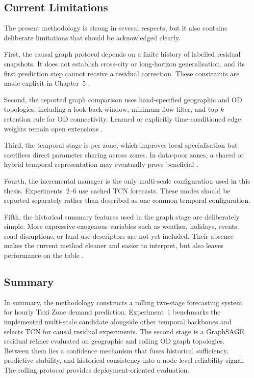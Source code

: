 \documentclass[12pt,a4paper]{report}
\begin{document}
\subsection{Current Limitations}

The present methodology is strong in several respects, but it also contains deliberate limitations that should be acknowledged clearly.

First, the causal graph protocol depends on a finite history of labelled residual snapshots. It does not establish cross-city or long-horizon generalisation, and its first prediction step cannot receive a residual correction. These constraints are made explicit in Chapter~5 \cite{hewamalage2022pitfalls,cerqueira2020evaluating}.

Second, the reported graph comparison uses hand-specified geographic and OD topologies, including a look-back window, minimum-flow filter, and top-\(k\) retention rule for OD connectivity. Learned or explicitly time-conditioned edge weights remain open extensions \cite{west2025weighted,jiang2022survey}.

Third, the temporal stage is per zone, which improves local specialisation but sacrifices direct parameter sharing across zones. In data-poor zones, a shared or hybrid temporal representation may eventually prove beneficial \cite{lim2021survey,zhuang2022sparse}.

Fourth, the incremental manager is the only multi-scale configuration used in this thesis. Experiments~2--6 use cached TCN forecasts. These modes should be reported separately rather than described as one common temporal configuration.

Fifth, the historical summary features used in the graph stage are deliberately simple. More expressive exogenous variables such as weather, holidays, events, road disruptions, or land-use descriptors are not yet included. Their absence makes the current method cleaner and easier to interpret, but also leaves performance on the table \cite{lyu2021bigdata,demandfeatures2023}.

\subsection{Summary}

In summary, the methodology constructs a rolling two-stage forecasting system for hourly Taxi Zone demand prediction. Experiment~1 benchmarks the implemented multi-scale candidate alongside other temporal backbones and selects TCN for causal residual experiments. The second stage is a GraphSAGE residual refiner evaluated on geographic and rolling OD graph topologies. Between them lies a confidence mechanism that fuses historical sufficiency, predictive stability, and historical consistency into a node-level reliability signal. The rolling protocol provides deployment-oriented evaluation.
\end{document}
